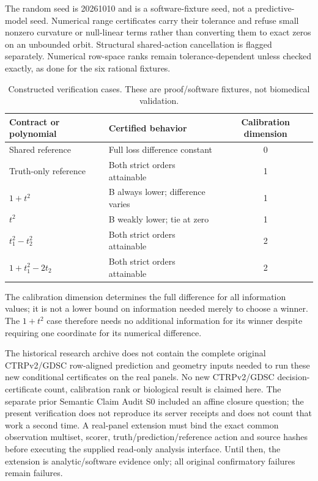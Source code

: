 \documentclass[11pt]{article}
\begin{document}
The random seed is 20261010 and is a software-fixture seed, not a predictive-model seed. Numerical range certificates carry their tolerance and refuse small nonzero curvature or null-linear terms rather than converting them to exact zeros on an unbounded orbit. Structural shared-action cancellation is flagged separately. Numerical row-space ranks remain tolerance-dependent unless checked exactly, as done for the six rational fixtures.

\begin{table}[htbp]
\centering\small
\caption{Constructed verification cases. These are proof/software fixtures, not biomedical validation.}
\begin{tabularx}{\linewidth}{@{}lXc@{}}
\toprule
Contract or polynomial & Certified behavior & Calibration dimension \\
\midrule
Shared reference & Full loss difference constant & 0 \\
Truth-only reference & Both strict orders attainable & 1 \\
$1+t^2$ & B always lower; difference varies & 1 \\
$t^2$ & B weakly lower; tie at zero & 1 \\
$t_1^2-t_2^2$ & Both strict orders attainable & 2 \\
$1+t_1^2-2t_2$ & Both strict orders attainable & 2 \\
\bottomrule
\end{tabularx}
\end{table}
The calibration dimension determines the full difference for all information values; it is not a lower bound on information needed merely to choose a winner. The $1+t^2$ case therefore needs no additional information for its winner despite requiring one coordinate for its numerical difference.

The historical research archive does not contain the complete original CTRPv2/GDSC row-aligned prediction and geometry inputs needed to run these new conditional certificates on the real panels. No new CTRPv2/GDSC decision-certificate count, calibration rank or biological result is claimed here. The separate prior Semantic Claim Audit S0 included an affine closure question; the present verification does not reproduce its server receipts and does not count that work a second time. A real-panel extension must bind the exact common observation multiset, scorer, truth/prediction/reference action and source hashes before executing the supplied read-only analysis interface. Until then, the extension is analytic/software evidence only; all original confirmatory failures remain failures.
\end{document}
